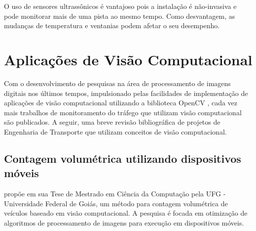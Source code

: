 O uso de sensores ultrassônicos é vantajoso pois a instalação é não-invasiva e pode monitorar mais de uma pista ao mesmo tempo. Como desvantagem, as mudanças de temperatura e ventanias podem afetar o seu desempenho.




\section{Aplicações de Visão Computacional} %
\label{sec:aplica_es_de_vis_o_computacional}

Com o desenvolvimento de pesquisas na área de processamento de imagens digitais nos últimos tempos, impulsionado pelas facilidades de implementação de aplicações de visão computacional utilizando a biblioteca OpenCV \citep{opencv_library}, cada vez mais trabalhos de monitoramento do tráfego que utilizam visão computacional são publicados. A seguir, uma breve revisão bibliográfica de projetos de Engenharia de Transporte que utilizam conceitos de visão computacional.







\subsection{Contagem volumétrica utilizando dispositivos móveis} %
\label{sub:contagem_volum_trica_utilizando_dispositivos_m_veis}

\cite{feitosa:2012:masther} propõe em sua Tese de Mestrado em Ciência da Computação pela UFG - Universidade Federal de Goiás, um método para contagem volumétrica de veículos baseado em visão computacional. A pesquisa é focada em otimização de algoritmos de processamento de imagens para execução em dispositivos móveis.

